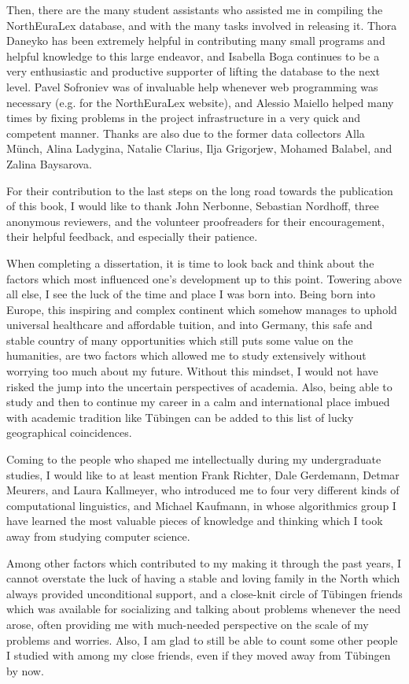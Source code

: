 Then, there are the many student assistants who assisted me in compiling the NorthEuraLex database, and with the many tasks involved in releasing it. Thora Daneyko has been extremely helpful in contributing many small programs and helpful knowledge to this large endeavor, and Isabella Boga continues to be a very enthusiastic and productive supporter of lifting the database to the next level. Pavel Sofroniev was of invaluable help whenever web programming was necessary (e.g. for the NorthEuraLex website), and Alessio Maiello helped many times by fixing problems in the project infrastructure in a very quick and competent manner. Thanks are also due to the former data collectors Alla Münch, Alina Ladygina, Natalie Clarius, Ilja Grigorjew, Mohamed Balabel, and Zalina Baysarova.

For their contribution to the last steps on the long road towards the publication of this book, I would like to thank John Nerbonne, Sebastian Nordhoff, three anonymous reviewers, and the volunteer proofreaders for their encouragement, their helpful feedback, and especially their patience.

When completing a dissertation, it is time to look back and think about the factors which most influenced one's development up to this point. Towering above all else, I see the luck of the time and place I was born into. Being born into Europe, this inspiring and complex continent which somehow manages to uphold universal healthcare and affordable tuition, and into Germany, this safe and stable country of many opportunities which still puts some value on the humanities, are two factors which allowed me to study extensively without worrying too much about my future. Without this mindset, I would not have risked the jump into the uncertain perspectives of academia. Also, being able to study and then to continue my career in a calm and international place imbued with academic tradition like Tübingen can be added to this list of lucky geographical coincidences.

Coming to the people who shaped me intellectually during my undergraduate studies, I would like to at least mention Frank Richter, Dale Gerdemann, Detmar Meurers, and Laura Kallmeyer, who introduced me to four very different kinds of computational linguistics, and Michael Kaufmann, in whose algorithmics group I have learned the most valuable pieces of knowledge and thinking which I took away from studying computer science.

Among other factors which contributed to my making it through the past years, I cannot overstate the luck of having a stable and loving family in the North which always provided unconditional support, and a close-knit circle of Tübingen friends which was available for socializing and talking about problems whenever the need arose, often providing me with much-needed perspective on the scale of my problems and worries. Also, I am glad to still be able to count some other people I studied with among my close friends, even if they moved away from Tübingen by now.

